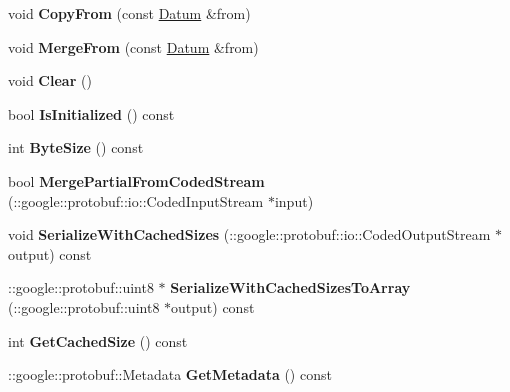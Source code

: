\begin{DoxyCompactItemize}
void {\bfseries Copy\+From} (const \mbox{\hyperlink{classcaffe_1_1_datum}{Datum}} \&from)
\item 
\mbox{\label{classcaffe_1_1_datum_aa63505abc5dff80a8f0212271e46546d}} 
void {\bfseries Merge\+From} (const \mbox{\hyperlink{classcaffe_1_1_datum}{Datum}} \&from)
\item 
\mbox{\label{classcaffe_1_1_datum_ada93a6d2a5379a43f050d23387b12102}} 
void {\bfseries Clear} ()
\item 
\mbox{\label{classcaffe_1_1_datum_a15c28ed72eff869c8edc1069931bdf58}} 
bool {\bfseries Is\+Initialized} () const
\item 
\mbox{\label{classcaffe_1_1_datum_a37d1339a58c2d2be8ef1c48183d411ed}} 
int {\bfseries Byte\+Size} () const
\item 
\mbox{\label{classcaffe_1_1_datum_a55fe5ea4de9d81cfcbf450b8ac9bf31d}} 
bool {\bfseries Merge\+Partial\+From\+Coded\+Stream} (\+::google\+::protobuf\+::io\+::\+Coded\+Input\+Stream $\ast$input)
\item 
\mbox{\label{classcaffe_1_1_datum_acfc77685a34a3869e9eb08c22ed809b7}} 
void {\bfseries Serialize\+With\+Cached\+Sizes} (\+::google\+::protobuf\+::io\+::\+Coded\+Output\+Stream $\ast$output) const
\item 
\mbox{\label{classcaffe_1_1_datum_a1cebc3c2b66f9ac7bcff3093ead9b53d}} 
\+::google\+::protobuf\+::uint8 $\ast$ {\bfseries Serialize\+With\+Cached\+Sizes\+To\+Array} (\+::google\+::protobuf\+::uint8 $\ast$output) const
\item 
\mbox{\label{classcaffe_1_1_datum_a620393c90b865c7a9706aeb2972de91d}} 
int {\bfseries Get\+Cached\+Size} () const
\item 
\mbox{\label{classcaffe_1_1_datum_a256e1c545bb6ae58cd2eb6aa107bd59a}} 
\+::google\+::protobuf\+::\+Metadata {\bfseries Get\+Metadata} () const
\item 
\mbox{\label{classcaffe_1_1_datum_a51859bc1e457c15357574c6df3cdb7f4}} 

\end{DoxyCompactItemize}
